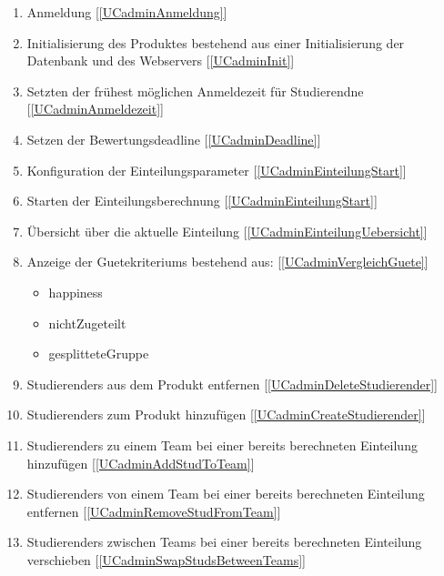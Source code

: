 \documentclass[parskip=full]{scrartcl}
\newcommand{\swtLabel}[1]{\textbf{/#1\arabic*0/}}
\newcommand{\testRef}[1]{[\ref{#1}]}
\begin{document}
\begin{enumerate}[label=\swtLabel{FA}, resume]
  \item Anmeldung \label{FAadminAnmeldung} \testRef{UCadminAnmeldung}
  \item Initialisierung des Produktes bestehend aus einer Initialisierung der
  Datenbank und des Webservers
  \label{FAadminInit} \testRef{UCadminInit}
  \item Setzten der frühest möglichen Anmeldezeit für Studierendne
  \label{FAadminAnmeldezeit}
  \testRef{UCadminAnmeldezeit}
  \item Setzen der Bewertungsdeadline \label{FAadminDeadline} \testRef{UCadminDeadline}
  \item Konfiguration der Einteilungsparameter \label{FAadminParameter}
  \testRef{UCadminEinteilungStart}
  \item Starten der Einteilungsberechnung \label{FAadminEinteilungstart}
  \testRef{UCadminEinteilungStart}
  \item Übersicht über die aktuelle Einteilung \label{FAadminÜbersicht}
  \testRef{UCadminEinteilungUebersicht}
  \item Anzeige der \glspl{Guetekriterium} bestehend aus:
  \testRef{UCadminVergleichGuete}
    \begin{itemize}
      \item \gls{happiness}
      \item \gls{nichtZugeteilt}
      \item \gls{gesplitteteGruppe}
    \end{itemize} \label{FAadminGüte} 
  \item \glspl{Studierender} aus dem Produkt entfernen
  \label{FAadminDeleteStudFromSystem} \testRef{UCadminDeleteStudierender}
  \item \glspl{Studierender} zum Produkt hinzufügen
  \label{FAadminAddStudToSystem} \testRef{UCadminCreateStudierender}
  \item \glspl{Studierender} zu einem \gls{Team} bei einer bereits berechneten
  Einteilung hinzufügen \label{FAadminAddStudToTeam} \testRef{UCadminAddStudToTeam}
  \item \glspl{Studierender} von einem \gls{Team} bei einer bereits berechneten
  Einteilung entfernen \label{FAadminRemoveStudFromTeam} \testRef{UCadminRemoveStudFromTeam}
  \item \glspl{Studierender} zwischen \glspl{Team} bei einer bereits berechneten
  Einteilung verschieben  \label{FAadminMoveStudsBetweenTeams} \testRef{UCadminSwapStudsBetweenTeams}

\end{enumerate}
\end{document}
